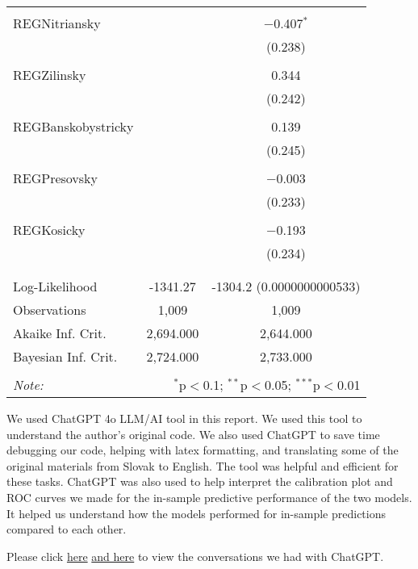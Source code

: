 \documentclass[titlepage]{article}
\begin{document}
\begin{table}[!htbp]
{\begin{tabular}{@{\extracolsep{5pt}}lcc}
  & & \\ 
 REGNitriansky &  & $-$0.407$^{*}$ \\ 
  &  & (0.238) \\ 
  & & \\ 
 REGZilinsky &  & 0.344 \\ 
  &  & (0.242) \\ 
  & & \\ 
 REGBanskobystricky &  & 0.139 \\ 
  &  & (0.245) \\ 
  & & \\ 
 REGPresovsky &  & $-$0.003 \\ 
  &  & (0.233) \\ 
  & & \\ 
 REGKosicky &  & $-$0.193 \\ 
  &  & (0.234) \\ 
  & & \\ 
\hline \\[-1.8ex] 
Log-Likelihood & -1341.27 & -1304.2 (0.0000000000533) \\ 
Observations & 1,009 & 1,009 \\ 
Akaike Inf. Crit. & 2,694.000 & 2,644.000 \\ 
Bayesian Inf. Crit. & 2,724.000 & 2,733.000 \\ 
\hline 
\hline \\[-1.8ex] 
\textit{Note:}  & \multicolumn{2}{r}{$^{*}$p$<$0.1; $^{**}$p$<$0.05; $^{***}$p$<$0.01} \\ 
\end{tabular}}
\end{table} 

\justify
We used ChatGPT 4o LLM/AI tool in this report. We used this tool to understand the author's original code. We also used ChatGPT to save time debugging our code, helping with latex formatting, and translating some of the original materials from Slovak to English. The tool was helpful and efficient for these tasks. ChatGPT was also used to help interpret the calibration plot and ROC curves we made for the in-sample predictive performance of the two models. It helped us understand how the models performed for in-sample predictions compared to each other.

\justify
Please click \href{https://chatgpt.com/share/67d47a4f-e0d8-8004-8a43-8cba73891e43}{here} \href{https://chatgpt.com/share/67d4a1ab-f9f4-8012-8bf6-c9248ddeb44c}{and here} to view the conversations we had with ChatGPT.
\end{document}
